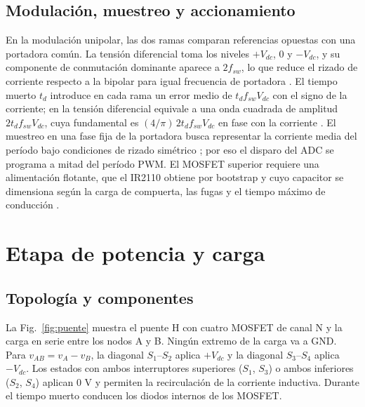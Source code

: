 \documentclass[conference]{IEEEtran}
\begin{document}
\subsection{Modulación, muestreo y accionamiento}
En la modulación unipolar, las dos ramas comparan referencias opuestas con una portadora común. La tensión diferencial toma los niveles $+V_{dc}$, 0 y $-V_{dc}$, y su componente de conmutación dominante aparece a $2f_{sw}$, lo que reduce el rizado de corriente respecto a la bipolar para igual frecuencia de portadora \cite{holmes}. El tiempo muerto $t_d$ introduce en cada rama un error medio de $t_df_{sw}V_{dc}$ con el signo de la corriente; en la tensión diferencial equivale a una onda cuadrada de amplitud $2t_df_{sw}V_{dc}$, cuya fundamental es $(4/\pi)\,2t_df_{sw}V_{dc}$ en fase con la corriente \cite{mohan}. El muestreo en una fase fija de la portadora busca representar la corriente media del período bajo condiciones de rizado simétrico \cite{buso}; por eso el disparo del ADC se programa a mitad del período PWM. El MOSFET superior requiere una alimentación flotante, que el IR2110 obtiene por bootstrap y cuyo capacitor se dimensiona según la carga de compuerta, las fugas y el tiempo máximo de conducción \cite{ir,an978}.

\section{Etapa de potencia y carga}
\subsection{Topología y componentes}
La Fig.~\ref{fig:puente} muestra el puente H con cuatro MOSFET de canal N y la carga en serie entre los nodos A y B. Ningún extremo de la carga va a GND. Para $v_{AB}=v_A-v_B$, la diagonal $S_1$--$S_2$ aplica $+V_{dc}$ y la diagonal $S_3$--$S_4$ aplica $-V_{dc}$. Los estados con ambos interruptores superiores ($S_1$, $S_3$) o ambos inferiores ($S_2$, $S_4$) aplican 0 V y permiten la recirculación de la corriente inductiva. Durante el tiempo muerto conducen los diodos internos de los MOSFET.
\end{document}
